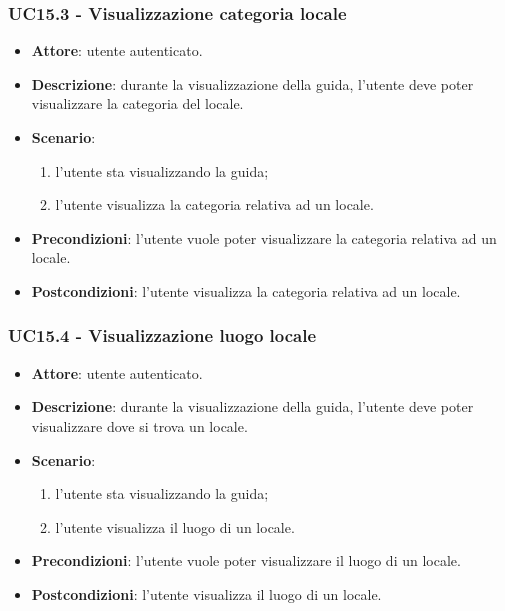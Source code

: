 \subsubsection{UC15.3 - Visualizzazione categoria locale}
\begin{itemize}
    \item \textbf{Attore}: utente autenticato.
    \item \textbf{Descrizione}: durante la visualizzazione della guida, l'utente deve poter visualizzare la categoria del locale.
    \item \textbf{Scenario}:
    \begin{enumerate}
        \item l'utente sta visualizzando la guida;
        \item l'utente visualizza la categoria relativa ad un locale.
    \end{enumerate}
    \item \textbf{Precondizioni}: l'utente vuole poter visualizzare la categoria relativa ad un locale.
    \item \textbf{Postcondizioni}: l'utente visualizza la categoria relativa ad un locale.
\end{itemize}

\subsubsection{UC15.4 - Visualizzazione luogo locale}
\begin{itemize}
    \item \textbf{Attore}: utente autenticato.
    \item \textbf{Descrizione}: durante la visualizzazione della guida, l'utente deve poter visualizzare dove si trova un locale.
    \item \textbf{Scenario}:
    \begin{enumerate}
        \item l'utente sta visualizzando la guida;
        \item l'utente visualizza il luogo di un locale.
    \end{enumerate}
    \item \textbf{Precondizioni}: l'utente vuole poter visualizzare il luogo di un locale.
    \item \textbf{Postcondizioni}: l'utente visualizza il luogo di un locale.
\end{itemize}

